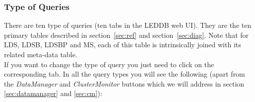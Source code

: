 \documentclass[a4paper,11pt]{article}
\begin{document}
\subsubsection{Type of Queries}

There are ten type of queries (ten tabs in the LEDDB web UI). They are the ten primary tables described in section~\ref{sec:ref} and section~\ref{sec:diag}. 
Note that for LDS, LDSB, LDSBP and MS, each of this table is intrinsically joined with its related meta-data table.\\

If you want to change the type of query you just need to click on the corresponding tab. 
In all the query types you will see the following (apart from the \textit{DataManager} and \textit{ClusterMonitor} buttons which we will address in section \ref{sec:datamanager} and \ref{sec:cm}):
\end{document}
